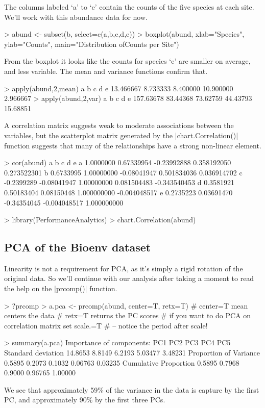 The columns labeled `a' to `e' contain the counts of the five species at each site.  We'll work with this abundance data for now.
%
\begin{R}
> abund <- subset(b, select=c(a,b,c,d,e))
> boxplot(abund, xlab="Species", ylab="Counts", main="Distribution of\nSpecies Counts per Site")
\end{R}

From the boxplot it looks like the counts for species `e' are smaller on average, and less variable. The mean and variance functions confirm that.
%
\begin{R}
> apply(abund,2,mean)
        a         b         c         d         e
13.466667  8.733333  8.400000 10.900000  2.966667
> apply(abund,2,var)
        a         b         c         d         e
157.63678  83.44368  73.62759  44.43793  15.68851
\end{R}


A correlation matrix suggests weak to moderate associations between the variables, but the scatterplot matrix generated by the |chart.Correlation()| function suggests that many of the relationships have a strong non-linear element.
%
\begin{R}
> cor(abund)
           a           b           c            d            e
a  1.0000000  0.67339954 -0.23992888  0.358192050  0.273522301
b  0.6733995  1.00000000 -0.08041947  0.501834036  0.036914702
c -0.2399289 -0.08041947  1.00000000  0.081504483 -0.343540453
d  0.3581921  0.50183404  0.08150448  1.000000000 -0.004048517
e  0.2735223  0.03691470 -0.34354045 -0.004048517  1.000000000

> library(PerformanceAnalytics)
> chart.Correlation(abund)
\end{R}

\subsection{PCA of the Bioenv dataset}
Linearity is not a requirement for PCA, as it's simply a rigid rotation of the original data. So we'll continue with our analysis after taking a moment to read the help on the |prcomp()| function.
\begin{R}
> ?prcomp
> a.pca <- prcomp(abund, center=T, retx=T)
    # center=T mean centers the data
    # retx=T returns the PC scores
    # if you want to do PCA on correlation matrix set scale.=T
    #    -- notice the period after scale!

> summary(a.pca)
Importance of components:
                           PC1    PC2    PC3     PC4     PC5
Standard deviation     14.8653 8.8149 6.2193 5.03477 3.48231
Proportion of Variance  0.5895 0.2073 0.1032 0.06763 0.03235
Cumulative Proportion   0.5895 0.7968 0.9000 0.96765 1.00000
\end{R}
We see that approximately 59\% of the variance in the data is capture by the first PC, and approximately 90\% by the first three PCs.

